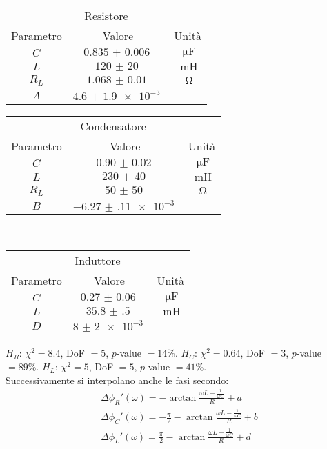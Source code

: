 \documentclass[a4paper]{article}
\begin{document}
\begin{center}
\begin{tabular}[t]{c|c|c}
        \multicolumn{3}{c}{Resistore} \\
	Parametro & Valore & Unità \\\midrule
	$C$ & $\SI{0.835(6)}{}$ & $\SI{}{\micro\F}$\\
	$L$ & $\SI{120(20)}{}$ & $\SI{}{\milli\henry}$\\
	$R_L$ & $\SI{1.068(10)}{}$ & $\SI{}{\ohm}$\\
	$A$ & $\SI{4.6(19)e-3}{}$ & \\
\end{tabular}\quad
\begin{tabular}[t]{c|c|c}
        \multicolumn{3}{c}{Condensatore} \\
	Parametro & Valore & Unità \\\midrule
	$C$ & $\SI{0.90(2)}{}$ & $\SI{}{\micro\F}$\\
	$L$ & $\SI{230(40)}{}$ & $\SI{}{\milli\henry}$\\
	$R_L$ & $\SI{50(50)}{}$ & $\SI{}{\ohm}$\\
	$B$ & $\SI{-6.27(11)e-3}{}$ & \\
\end{tabular}\\[5mm]
\begin{tabular}[t]{c|c|c}
        \multicolumn{3}{c}{Induttore} \\
	Parametro & Valore & Unità \\\midrule
	$C$ & $\SI{0.27(6)}{}$ & $\SI{}{\micro\F}$\\
	$L$ & $\SI{35.8(5)}{}$ & $\SI{}{\milli\henry}$\\
	$D$ & $\SI{8(2)e-3}{}$ & \\
\end{tabular}
\end{center}
$H_R$: $\chi^2=8.4$, DoF $=5$, $p$-value $=14\%$. $H_C$: $\chi^2=0.64$, DoF $=3$, $p$-value $=89\%$. $H_L$: $\chi^2=5$, DoF $=5$, $p$-value $=41\%$.\\
Successivamente si interpolano anche le fasi secondo:
\begin{gather*}
	\Delta \phi_R'(\omega)=-\arctan \frac{\omega L -\frac{1}{\omega C}}{R}+a\\
	\Delta \phi_C'(\omega)=-\frac{\pi}{2}-\arctan \frac{\omega L -\frac{1}{\omega C}}{R}+b\\
	\Delta \phi_L'(\omega)=\frac{\pi}{2}-\arctan \frac{\omega L -\frac{1}{\omega C}}{R}+d
\end{gather*}
\end{document}
